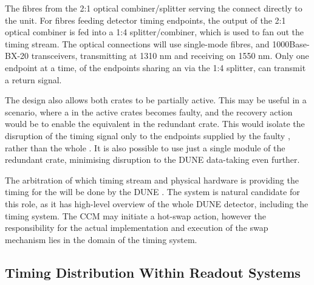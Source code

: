 \documentclass[main.tex]{subfiles}
\begin{document}
The fibres from the 2:1 optical combiner/splitter serving the  connect directly to the unit. For fibres feeding detector timing endpoints, the output of the 2:1 optical combiner is fed into a 1:4 splitter/combiner, which is used to fan out the  timing stream. The optical connections will use single-mode fibres, and 1000Base-BX-20  transceivers, transmitting at 1310 nm and receiving on 1550 nm. Only one endpoint at a time, of the endpoints sharing an  via the 1:4 splitter, can transmit a return signal.

The design also allows both crates to be partially active. This may be useful in a scenario, where a  in the active crates becomes faulty, and the recovery action would be to enable the equivalent  in the redundant crate. This would isolate the disruption of the timing signal only to the endpoints supplied by the faulty , rather than the whole . It is also possible to use just a single  module of the redundant crate, minimising disruption to the DUNE data-taking even further.

The arbitration of which  timing stream and physical hardware is providing the timing for the  will be done by the DUNE . The  system is natural candidate for this role, as it has high-level overview of the whole DUNE detector, including the timing system. The CCM may initiate a hot-swap action, however the responsibility for the actual implementation and execution of the swap mechanism lies in the domain of the timing system.


\subsection{Timing Distribution Within Readout Systems}
\end{document}
